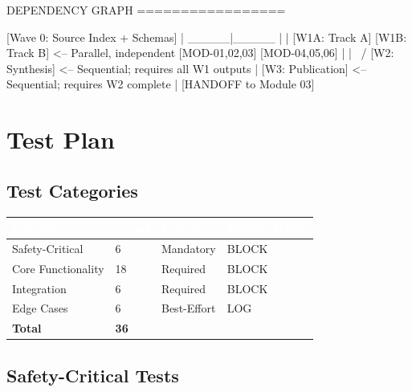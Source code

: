 \documentclass[11pt,letterpaper]{article}
\newcommand{\tableheader}[1]{\textbf{\sffamily\textcolor{white}{#1}}}
\begin{document}
\begin{asciibox}
DEPENDENCY GRAPH
=================

  [Wave 0: Source Index + Schemas]
         |
    _____|_____
   |           |
[W1A: Track A] [W1B: Track B]  <-- Parallel, independent
[MOD-01,02,03] [MOD-04,05,06]
   |           |
    \         /
     [W2: Synthesis]           <-- Sequential; requires all W1 outputs
           |
    [W3: Publication]          <-- Sequential; requires W2 complete
           |
    [HANDOFF to Module 03]
\end{asciibox}

\section{Test Plan}

\subsection{Test Categories}

\begin{center}
\begin{tabularx}{\textwidth}{L{3.5cm}C{2cm}C{2cm}X}
\toprule
{}
\tableheader{Category} & \tableheader{Count} & \tableheader{Priority} & \tableheader{Failure Action} \\
\midrule
Safety-Critical & 6 & Mandatory & BLOCK \\
Core Functionality & 18 & Required & BLOCK \\
Integration & 6 & Required & BLOCK \\
Edge Cases & 6 & Best-Effort & LOG \\
\midrule
\textbf{Total} & \textbf{36} & & \\
\bottomrule
\end{tabularx}
\end{center}

\subsection{Safety-Critical Tests}
\end{document}
